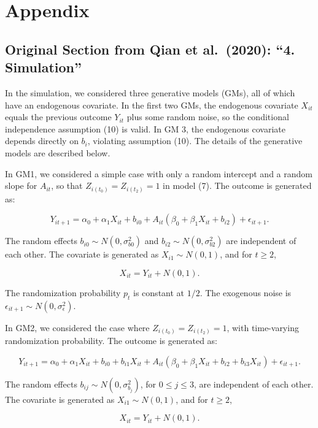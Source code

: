 \documentclass[
  12pt,
  a4paper,
]{article}
\begin{document}
\section{Appendix}\label{appendix}

\subsection{Original Section from Qian et al.~(2020): ``4.
Simulation''}\label{original-section-from-qian-et-al.-2020-4.-simulation}

In the simulation, we considered three generative models (GMs), all of
which have an endogenous covariate. In the first two GMs, the endogenous
covariate \(X_{it}\) equals the previous outcome \(Y_{it}\) plus some
random noise, so the conditional independence assumption (10) is valid.
In GM 3, the endogenous covariate depends directly on \(b_i\), violating
assumption (10). The details of the generative models are described
below.

In GM1, we considered a simple case with only a random intercept and a
random slope for \(A_{it}\), so that \(Z_{i(t_0)} = Z_{i(t_2)} = 1\) in
model (7). The outcome is generated as:

\[
Y_{it+1} = \alpha_0 + \alpha_1 X_{it} + b_{i0} + A_{it} (\beta_0 + \beta_1 X_{it} + b_{i2}) + \epsilon_{it+1}.
\]

The random effects \(b_{i0} \sim N(0, \sigma_{b0}^2)\) and
\(b_{i2} \sim N(0, \sigma_{b2}^2)\) are independent of each other. The
covariate is generated as \(X_{i1} \sim N(0, 1)\), and for \(t \geq 2\),

\[
X_{it} = Y_{it} + N(0, 1).
\]

The randomization probability \(p_t\) is constant at \(1/2\). The
exogenous noise is \(\epsilon_{it+1} \sim N(0, \sigma_\epsilon^2)\).

In GM2, we considered the case where \(Z_{i(t_0)} = Z_{i(t_2)} = 1\),
with time-varying randomization probability. The outcome is generated
as:

\[
Y_{it+1} = \alpha_0 + \alpha_1 X_{it} + b_{i0} + b_{i1} X_{it} + A_{it} (\beta_0 + \beta_1 X_{it} + b_{i2} + b_{i3} X_{it}) + \epsilon_{it+1}.
\]

The random effects \(b_{ij} \sim N(0, \sigma_{b_j}^2)\), for
\(0 \leq j \leq 3\), are independent of each other. The covariate is
generated as \(X_{i1} \sim N(0, 1)\), and for \(t \geq 2\),

\[
X_{it} = Y_{it} + N(0, 1).
\]
\end{document}

